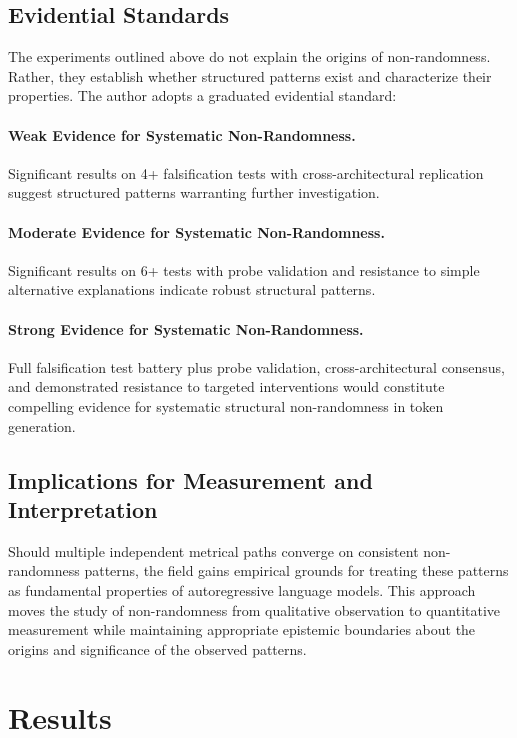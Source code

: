 \documentclass[12pt]{article}
\begin{document}
\subsection{Evidential Standards}

The experiments outlined above do not explain the origins of non-randomness. Rather, they establish whether structured patterns exist and characterize their properties. The author adopts a graduated evidential standard:

\paragraph{Weak Evidence for Systematic Non-Randomness.}
Significant results on 4+ falsification tests with cross-architectural replication suggest structured patterns warranting further investigation.

\paragraph{Moderate Evidence for Systematic Non-Randomness.}
Significant results on 6+ tests with probe validation and resistance to simple alternative explanations indicate robust structural patterns.

\paragraph{Strong Evidence for Systematic Non-Randomness.}
Full falsification test battery plus probe validation, cross-architectural consensus, and demonstrated resistance to targeted interventions would constitute compelling evidence for systematic structural non-randomness in token generation.

\subsection{Implications for Measurement and Interpretation}

Should multiple independent metrical paths converge on consistent non-randomness patterns, the field gains empirical grounds for treating these patterns as fundamental properties of autoregressive language models. This approach moves the study of non-randomness from qualitative observation to quantitative measurement while maintaining appropriate epistemic boundaries about the origins and significance of the observed patterns.

\section{Results}\label{sec:results}
\end{document}
